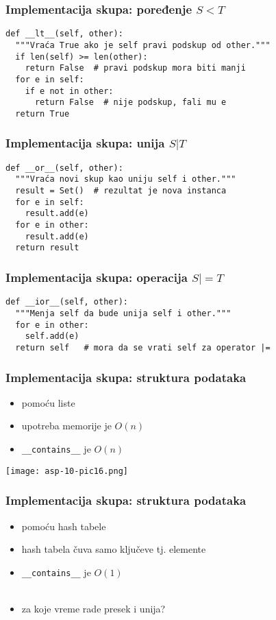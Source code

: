 \documentclass[compress]{beamer}
\begin{document}
\begin{frame}
  \frametitle{Implementacija skupa: poređenje $S < T$}
\begin{verbatim}
def __lt__(self, other):
  """Vraća True ako je self pravi podskup od other."""
  if len(self) >= len(other):
    return False  # pravi podskup mora biti manji
  for e in self:
    if e not in other:
      return False  # nije podskup, fali mu e
  return True
  \end{verbatim}
\end{frame}

\begin{frame}
  \frametitle{Implementacija skupa: unija $S | T$}
\begin{verbatim}
def __or__(self, other):
  """Vraća novi skup kao uniju self i other."""
  result = Set()  # rezultat je nova instanca
  for e in self:
    result.add(e)
  for e in other:
    result.add(e)
  return result
\end{verbatim}
\end{frame}

\begin{frame}
  \frametitle{Implementacija skupa: operacija $S |= T$}
\begin{verbatim}
def __ior__(self, other):
  """Menja self da bude unija self i other."""
  for e in other:
    self.add(e)
  return self   # mora da se vrati self za operator |=
\end{verbatim}
\end{frame}

\begin{frame}[fragile]
  \frametitle{Implementacija skupa: struktura podataka}
  \begin{itemize}
    \item pomoću liste
    \item upotreba memorije je $O(n)$
    \item \texttt{\_\_contains\_\_} je $O(n)$
  \end{itemize} 
  \begin{center}
    \texttt{[image: asp-10-pic16.png]}
  \end{center}
\end{frame}

\begin{frame}[fragile]
  \frametitle{Implementacija skupa: struktura podataka}
  \begin{itemize}
    \item pomoću hash tabele
    \item hash tabela čuva samo ključeve tj. elemente
    \item \texttt{\_\_contains\_\_} je $O(1)$ \\ \ \\
    \item za koje vreme rade presek i unija?
  \end{itemize} 
\end{frame}
\end{document}
